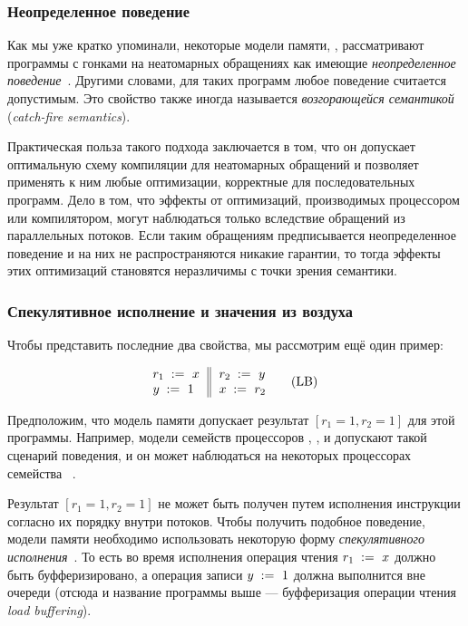 \subsubsection{Неопределенное поведение}
\label{sec:background:ub}

Как мы уже кратко упоминали, некоторые модели памяти,
\eg \CPP, рассматривают программы с гонками 
на неатомарных обращениях как имеющие 
\emph{неопределенное поведение}~\cite{Boehm-Adve:PLDI08}.
Другими словами, для таких программ любое поведение считается допустимым. 
Это свойство также иногда называется 
\emph{возгорающейся семантикой} (\emph{catch-fire semantics}).
 
Практическая польза такого подхода заключается в том,
что он допускает оптимальную схему компиляции для 
неатомарных обращений и позволяет применять к ним 
любые оптимизации, корректные для последовательных программ.
Дело в том, что эффекты от оптимизаций, производимых 
процессором или компилятором, могут наблюдаться 
только вследствие обращений из параллельных потоков. 
Если таким обращениям предписывается неопределенное поведение и на них 
не распространяются никакие гарантии, 
то тогда эффекты этих оптимизаций 
становятся неразличимы с точки зрения семантики. 
 
\subsubsection{Спекулятивное исполнение и значения из воздуха}
\label{sec:background:oota}

Чтобы представить последние два свойства, мы рассмотрим ещё один пример:

\begin{equation*}
\inarrII{
  \readInst{}{r_1}{x}     \\
  \writeInst{}{y}{1}      \\
}{
  \readInst{}{r_2}{y}     \\
  \writeInst{}{x}{r_2}    \\
}
\tag{LB}\label{ex:lb}
\end{equation*}

Предположим, что модель памяти допускает 
результат ${[r_1=1, r_2=1]}$ для этой программы. 
Например, модели семейств процессоров 
, , и \POWER
допускают такой сценарий поведения, 
и он может наблюдаться на некоторых процессорах семейства 
~\cite{Maranget-al:Tutorial2012}.

Результат ${[r_1=1, r_2=1]}$ не может быть получен 
путем исполнения инструкции согласно их порядку внутри потоков.
Чтобы получить подобное поведение, 
модели памяти необходимо использовать 
некоторую форму \emph{спекулятивного исполнения}~\cite{Boudol-Petri:ESOP10, Boehm-Demsky:MSPC14}.
То есть во время исполнения операция чтения $r_1\;:=_{}\;x$
должно быть буфферизировано, а операция записи $y\;:=_{}\;1$ 
должна выполнится вне очереди 
(отсюда и название программы выше --- 
буфферизация операции чтения \emph{load buffering}).

